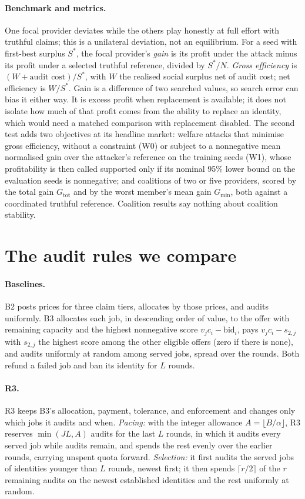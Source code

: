 \documentclass[11pt]{article}
\begin{document}
\paragraph{Benchmark and metrics.} One focal provider deviates while the others play honestly at full effort with truthful claims; this is a unilateral deviation, not an equilibrium. For a seed with first-best surplus $S^*$, the focal provider's \emph{gain} is its profit under the attack minus its profit under a selected truthful reference, divided by $S^*/N$. \emph{Gross efficiency} is $(W + \text{audit cost})/S^*$, with $W$ the realised social surplus net of audit cost; net efficiency is $W/S^*$. Gain is a difference of two searched values, so search error can bias it either way. It is excess profit when replacement is available; it does not isolate how much of that profit comes from the ability to replace an identity, which would need a matched comparison with replacement disabled. The second test adds two objectives at its headline market: welfare attacks that minimise gross efficiency, without a constraint (W0) or subject to a nonnegative mean normalised gain over the attacker's reference on the training seeds (W1), whose profitability is then called supported only if its nominal 95\% lower bound on the evaluation seeds is nonnegative; and coalitions of two or five providers, scored by the total gain $G_{\mathrm{tot}}$ and by the worst member's mean gain $G_{\min}$, both against a coordinated truthful reference. Coalition results say nothing about coalition stability.

\section{The audit rules we compare}\label{sec:rules}
\paragraph{Baselines.} B2 posts prices for three claim tiers, allocates by those prices, and audits uniformly. B3 allocates each job, in descending order of value, to the offer with remaining capacity and the highest nonnegative score $v_j c_i - \mathrm{bid}_i$, pays $v_j c_i - s_{2,j}$ with $s_{2,j}$ the highest score among the other eligible offers (zero if there is none), and audits uniformly at random among served jobs, spread over the rounds. Both refund a failed job and ban its identity for $L$ rounds.

\paragraph{R3.} R3 keeps B3's allocation, payment, tolerance, and enforcement and changes only which jobs it audits and when. \emph{Pacing:} with the integer allowance $A = \lfloor B/\alpha \rfloor$, R3 reserves $\min(JL, A)$ audits for the last $L$ rounds, in which it audits every served job while audits remain, and spends the rest evenly over the earlier rounds, carrying unspent quota forward. \emph{Selection:} it first audits the served jobs of identities younger than $L$ rounds, newest first; it then spends $\lceil r/2 \rceil$ of the $r$ remaining audits on the newest established identities and the rest uniformly at random.
\end{document}
